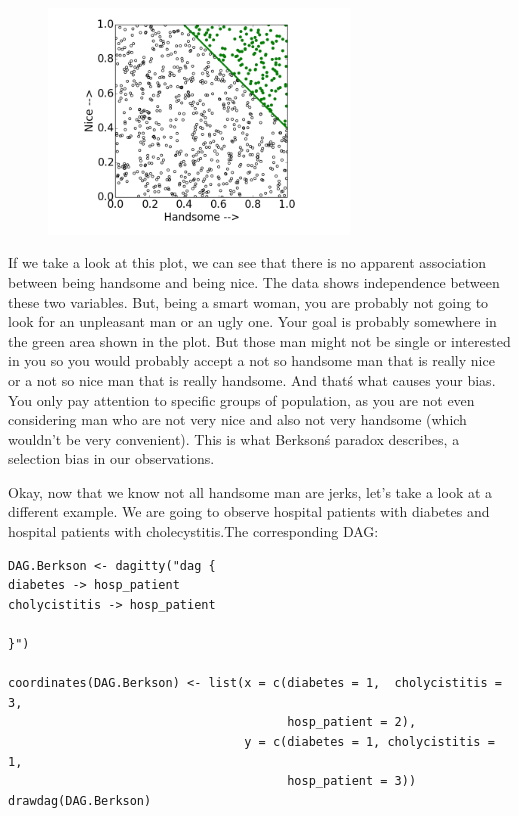 \documentclass{article}
\begin{document}
\begin{figure}[h]
\includegraphics[width=8cm]{berkson_men.png}
\centering
\end{figure}

If we take a look at this plot, we can see that there is no apparent association between being handsome and being nice. The data shows independence between these two variables. But, being a smart woman, you are probably not going to look for an unpleasant man or an ugly one. Your goal is probably somewhere in the green area shown in the plot. But those man might not be single or interested in you so you would probably accept a not so handsome man that is really nice or a not so nice man that is really handsome. And that\'s what causes your bias. You only pay attention to specific groups of population, as you are not even considering man who are not very nice and also not very handsome (which wouldn't be very convenient). This is what Berkson\'s paradox describes, a selection bias in our observations.

Okay, now that we know not all handsome man are jerks, let's take a look at a different example.
We are going to observe hospital patients with diabetes and hospital patients with cholecystitis.The corresponding DAG:

\begin{lstlisting}
DAG.Berkson <- dagitty("dag {
diabetes -> hosp_patient
cholycistitis -> hosp_patient

}")

coordinates(DAG.Berkson) <- list(x = c(diabetes = 1,  cholycistitis = 3, 
                                       hosp_patient = 2),
                                 y = c(diabetes = 1, cholycistitis = 1, 
                                       hosp_patient = 3))
drawdag(DAG.Berkson)
\end{lstlisting}
\end{document}
